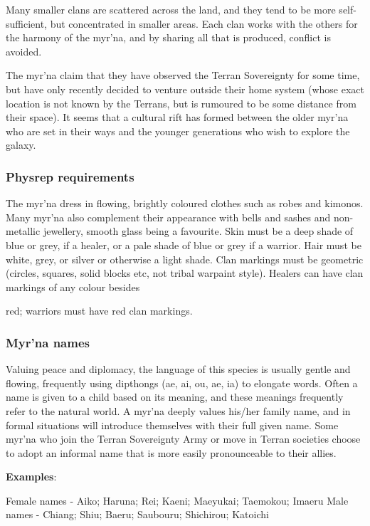 Many smaller clans are scattered across the land, and they tend to be more self-sufficient, but concentrated in smaller areas. Each clan works with the others for the harmony of the myr'na, and by sharing all that is produced, conflict is avoided.

The myr'na claim that they have observed the Terran Sovereignty for some time, but have only recently decided to venture outside their home system (whose exact location is not known by the Terrans, but is rumoured to be some distance from their space). It seems that a cultural rift has formed between the older myr'na who are set in their ways and the younger generations who wish to explore the galaxy.

\subsubsection{Physrep requirements}

The myr'na dress in flowing, brightly coloured clothes such as robes and kimonos. Many myr'na also complement their appearance with bells and sashes and non-metallic jewellery, smooth glass being a favourite. Skin must be a deep shade of blue or grey, if a healer, or a pale shade of blue or grey if a warrior. Hair must be white, grey, or silver or otherwise a light shade. Clan markings must be geometric (circles, squares, solid blocks etc, not tribal warpaint style). Healers can have clan markings of any colour besides

red; warriors must have red clan markings.

\subsubsection{Myr'na names}

Valuing peace and diplomacy, the language of this species is usually gentle and flowing, frequently using dipthongs (ae, ai, ou, ae, ia) to elongate words. Often a name is given to a child based on its meaning, and these meanings frequently refer to the natural world. A myr'na deeply values his/her family name, and in formal situations will introduce themselves with their full given name. Some myr'na who join the Terran Sovereignty Army or move in Terran societies choose to adopt an informal name that is more easily pronounceable to their allies.

\textbf{Examples}:

Female names - Aiko; Haruna; Rei; Kaeni; Maeyukai; Taemokou; Imaeru Male names - Chiang; Shiu; Baeru; Saubouru; Shichirou; Katoichi

